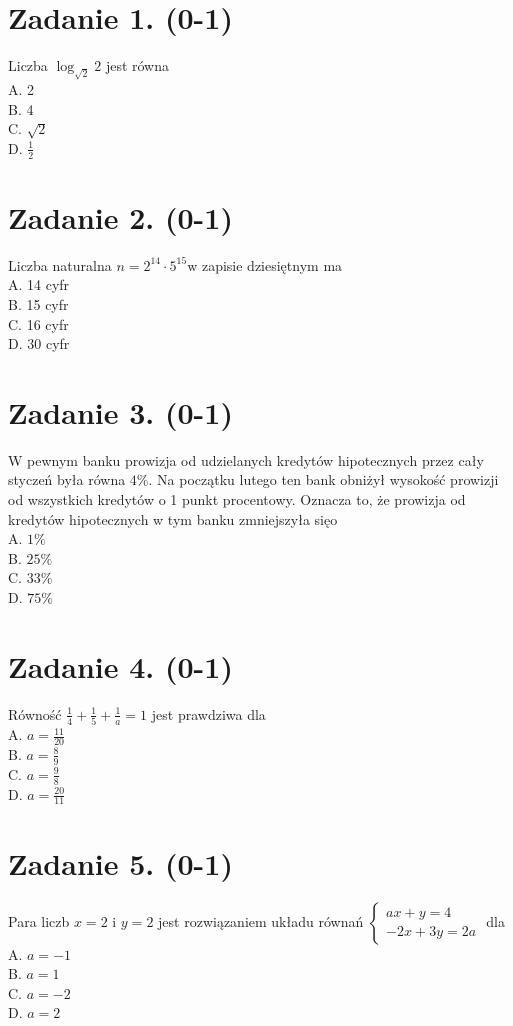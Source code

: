 \documentclass[10pt]{article}
\begin{document}
\section*{Zadanie 1. (0-1)}
Liczba \(\log _{\sqrt{2}} 2\) jest równa\\
A. 2\\
B. 4\\
C. \(\sqrt{2}\)\\
D. \(\frac{1}{2}\)

\section*{Zadanie 2. (0-1)}
Liczba naturalna \(n=2^{14} \cdot 5^{15} \mathrm{w}\) zapisie dziesiętnym ma\\
A. 14 cyfr\\
B. 15 cyfr\\
C. 16 cyfr\\
D. 30 cyfr

\section*{Zadanie 3. (0-1)}
W pewnym banku prowizja od udzielanych kredytów hipotecznych przez cały styczeń była równa \(4 \%\). Na początku lutego ten bank obniżył wysokość prowizji od wszystkich kredytów o 1 punkt procentowy. Oznacza to, że prowizja od kredytów hipotecznych w tym banku zmniejszyła sięo\\
A. \(1 \%\)\\
B. \(25 \%\)\\
C. \(33 \%\)\\
D. \(75 \%\)

\section*{Zadanie 4. (0-1)}
Równość \(\frac{1}{4}+\frac{1}{5}+\frac{1}{a}=1\) jest prawdziwa dla\\
A. \(a=\frac{11}{20}\)\\
B. \(a=\frac{8}{9}\)\\
C. \(a=\frac{9}{8}\)\\
D. \(a=\frac{20}{11}\)

\section*{Zadanie 5. (0-1)}
Para liczb \(x=2\) i \(y=2\) jest rozwiązaniem układu równań \(\left\{\begin{array}{c}a x+y=4 \\ -2 x+3 y=2 a\end{array}\right.\) dla\\
A. \(a=-1\)\\
B. \(a=1\)\\
C. \(a=-2\)\\
D. \(a=2\)
\end{document}
